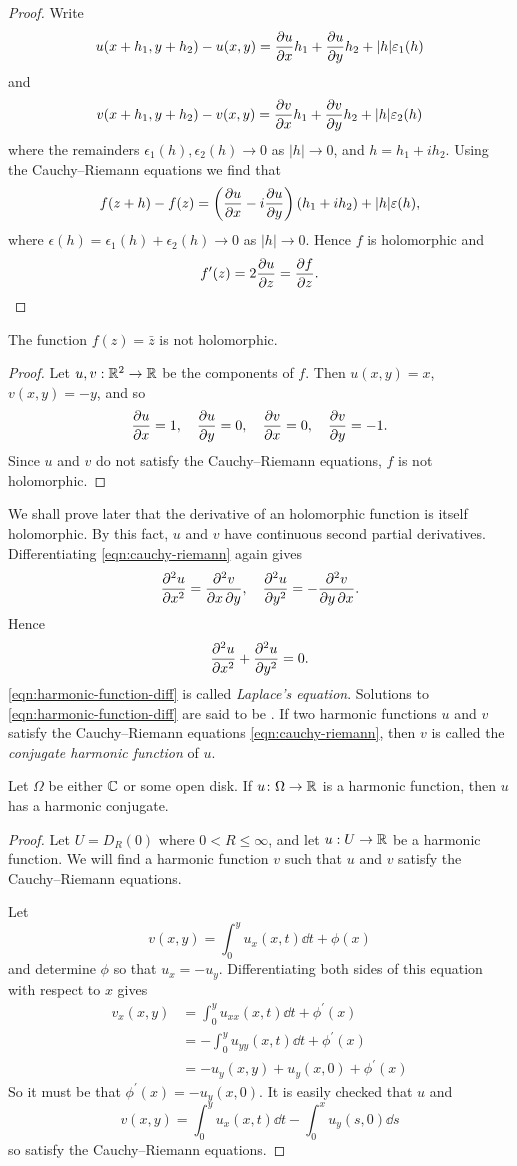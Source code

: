 \begin{proof}
Write
\[u(x+h_1,y+h_2)-u(x,y)=\pdv{u}{x}h_1+\pdv{u}{y}h_2+|h|\varepsilon_1(h)\]
and
\[v(x+h_1,y+h_2)-v(x,y)=\pdv{v}{x}h_1+\pdv{v}{y}h_2+|h|\varepsilon_2(h)\]
where the remainders $\epsilon_1(h),\epsilon_2(h)\to 0$ as $|h|\to 0$, and $h=h_1+ih_2$. Using the Cauchy--Riemann equations we find that
\[f(z+h)-f(z)=\left(\pdv{u}{x}-i\pdv{u}{y}\right)(h_1+ih_2)+|h|\varepsilon(h),\]
where $\epsilon(h)=\epsilon_1(h)+\epsilon_2(h)\to 0$ as $|h|\to 0$. Hence $f$ is holomorphic and
\[f^\prime(z)=2\pdv{u}{z}=\pdv{f}{z}.\] 
\end{proof}

\begin{example}
The function $f(z)=\bar{z}$ is not holomorphic.
\begin{proof}
Let $u,v:\mathbb R^2\to\mathbb R$ be the components of $f$. Then $u(x,y) = x$, $v(x,y)=-y$, and so
\[\pdv{u}{x}=1,\quad\pdv{u}{y}=0,\quad\pdv{v}{x}=0,\quad\pdv{v}{y}=-1.\]
Since $u$ and $v$ do not satisfy the Cauchy--Riemann equations, $f$ is not holomorphic.
\end{proof}
\end{example}

We shall prove later that the derivative of an holomorphic function is itself holomorphic. By this fact, $u$ and $v$ have continuous second partial derivatives. Differentiating \eqref{eqn:cauchy-riemann} again gives
\[\pdv[2]{u}{x}=\pdv{v}{x,y},\quad\pdv[2]{u}{y}=-\pdv{v}{y,x}.\]
Hence
\begin{equation}\label{eqn:harmonic-function-diff}
\pdv[2]{u}{x}+\pdv[2]{u}{y}=0.
\end{equation}
\eqref{eqn:harmonic-function-diff} is called \emph{Laplace's equation}. Solutions to \eqref{eqn:harmonic-function-diff} are said to be . If two harmonic functions $u$ and $v$ satisfy the Cauchy--Riemann equations \eqref{eqn:cauchy-riemann}, then $v$ is called the \emph{conjugate harmonic function} of $u$.

\begin{proposition}
Let $\Omega$ be either $\mathbb C$ or some open disk. If $u\colon\Omega\to\mathbb R$ is a harmonic function, then $u$ has a harmonic conjugate.
\end{proposition}

\begin{proof}
Let $U=D_R(0)$ where $0<R\le\infty$, and let $u:U\to\mathbb R$ be a harmonic function. We will find a harmonic function $v$ such that $u$ and $v$ satisfy the Cauchy--Riemann equations.

Let
\[v(x,y)=\int_{0}^{y}u_x(x,t)\dd{t}+\phi(x)\]
and determine $\phi$ so that $u_x=-u_y$. Differentiating both sides of this equation with respect to $x$ gives
\begin{align*}
v_x(x,y)&=\int_{0}^{y}u_{xx}(x,t)\dd{t}+\phi^\prime(x)\\
&=-\int_{0}^{y}u_{yy}(x,t)\dd{t}+\phi^\prime(x)\\
&=-u_y(x,y)+u_y(x,0)+\phi^\prime(x)
\end{align*}
So it must be that $\phi^\prime(x)=-u_y(x,0)$. It is easily checked that $u$ and
\[v(x,y)=\int_{0}^{y}u_x(x,t)\dd{t}-\int_{0}^{x}u_y(s,0)\dd{s}\]
so satisfy the Cauchy--Riemann equations.
\end{proof}

